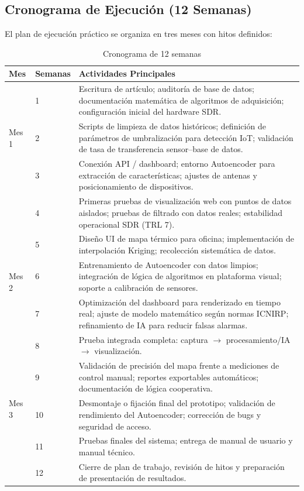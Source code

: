 \documentclass[12pt,a4paper]{article}
\begin{document}
\subsection{Cronograma de Ejecución (12 Semanas)}

El plan de ejecución práctico se organiza en tres meses con hitos definidos:

\begin{table}[H]
\centering
\caption{Cronograma de 12 semanas}
\label{tab:schedule}
\begin{tabular}{@{}p{2.5cm}p{2.5cm}p{9cm}@{}}
\toprule
\textbf{Mes} & \textbf{Semanas} & \textbf{Actividades Principales} \\
\midrule
\multirow{3}{*}{Mes 1} & 1 & Escritura de artículo; auditoría de base de datos; documentación matemática de algoritmos de adquisición; configuración inicial del hardware SDR. \\
& 2 & Scripts de limpieza de datos históricos; definición de parámetros de umbralización para detección IoT; validación de tasa de transferencia sensor--base de datos. \\
& 3 & Conexión API / dashboard; entorno Autoencoder para extracción de características; ajustes de antenas y posicionamiento de dispositivos. \\
& 4 & Primeras pruebas de visualización web con puntos de datos aislados; pruebas de filtrado con datos reales; estabilidad operacional SDR (TRL 7). \\
\midrule
\multirow{3}{*}{Mes 2} & 5 & Diseño UI de mapa térmico para oficina; implementación de interpolación Kriging; recolección sistemática de datos. \\
& 6 & Entrenamiento de Autoencoder con datos limpios; integración de lógica de algoritmos en plataforma visual; soporte a calibración de sensores. \\
& 7 & Optimización del dashboard para renderizado en tiempo real; ajuste de modelo matemático según normas ICNIRP; refinamiento de IA para reducir falsas alarmas. \\
& 8 & Prueba integrada completa: captura $\to$ procesamiento/IA $\to$ visualización. \\
\midrule
\multirow{3}{*}{Mes 3} & 9 & Validación de precisión del mapa frente a mediciones de control manual; reportes exportables automáticos; documentación de lógica cooperativa. \\
& 10 & Desmontaje o fijación final del prototipo; validación de rendimiento del Autoencoder; corrección de bugs y seguridad de acceso. \\
& 11 & Pruebas finales del sistema; entrega de manual de usuario y manual técnico. \\
& 12 & Cierre de plan de trabajo, revisión de hitos y preparación de presentación de resultados. \\
\bottomrule
\end{tabular}
\end{table}
\end{document}
